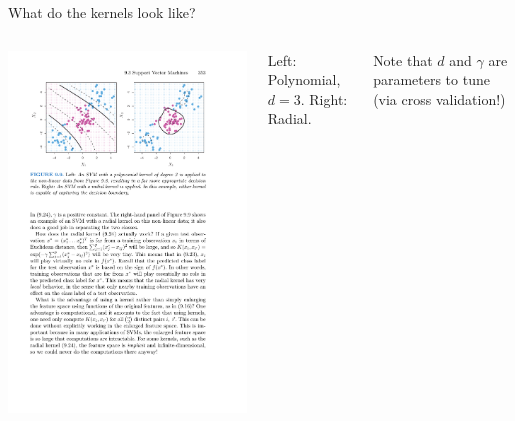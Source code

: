 \documentclass[mathserif, aspectratio=169]{beamer}
\begin{document}
\begin{frame}{What do the kernels look like?}
	\begin{columns}

		\includegraphics[scale=0.8]{SVM_kernels}


		Left: Polynomial, $d=3$.  Right: Radial.

		\vspace{5mm}
		Note that $d$ and $\gamma$ are parameters to tune (via cross validation!)
	\end{columns}
\end{frame}
\end{document}
